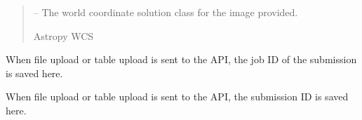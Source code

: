 \documentclass[letterpaper,11pt,english]{sphinxmanual}
\begin{document}
\begin{savenotes}
\begin{fulllineitems}
\begin{savenotes}
\begin{fulllineitems}
\begin{quote}
\begin{description}
\sphinxAtStartPar
{} – The world coordinate solution class for the image provided.

\sphinxAtStartPar
Astropy WCS

\end{description}\end{quote}

\end{fulllineitems}\end{savenotes}


\begin{savenotes}\begin{fulllineitems}
\label{\detokenize{code/opihiexarata.astrometry.webclient:opihiexarata.astrometry.webclient.AstrometryNetWebAPIEngine.job_id}}
\pysigstartsignatures
{}
\pysigstopsignatures
\sphinxAtStartPar
When file upload or table upload is sent to the API, the job ID of the submission is saved here.

\end{fulllineitems}\end{savenotes}


\begin{savenotes}\begin{fulllineitems}
\label{\detokenize{code/opihiexarata.astrometry.webclient:opihiexarata.astrometry.webclient.AstrometryNetWebAPIEngine.submission_id}}
\pysigstartsignatures
{}
\pysigstopsignatures
\sphinxAtStartPar
When file upload or table upload is sent to the API, the submission ID is saved here.

\end{fulllineitems}\end{savenotes}


\end{fulllineitems}
\end{savenotes}
\end{document}
